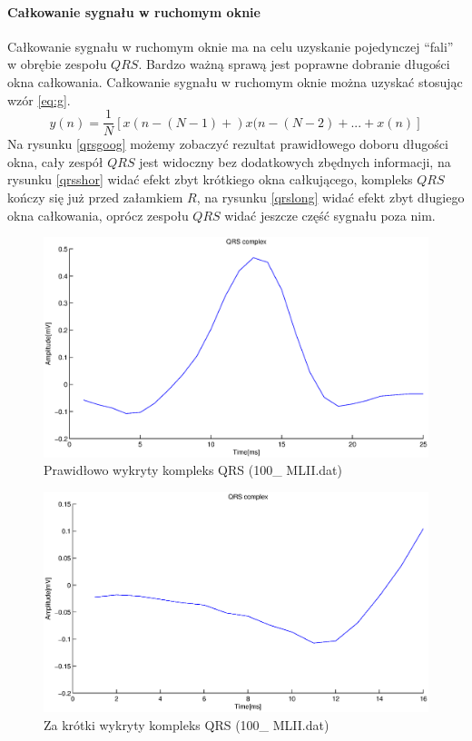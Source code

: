 \documentclass[a4paper, 11pt]{article}
\begin{document}
\paragraph{Całkowanie sygnału w ruchomym oknie}
Całkowanie sygnału w ruchomym oknie ma na celu uzyskanie pojedynczej “fali” w obrębie
zespołu $QRS$. Bardzo ważną sprawą jest poprawne dobranie długości okna całkowania. Całkowanie sygnału w ruchomym oknie można uzyskać stosując wzór \eqref{eq:g}.
\begin{equation}
y(n) = \frac{1}{N}[x(n-(N-1)+)x(n-(N-2)+...+ x(n)]\label{eq:g}
\end{equation}
Na rysunku \eqref{qrsgoog} możemy zobaczyć rezultat prawidłowego doboru długości okna, cały zespół $QRS$ jest widoczny bez dodatkowych zbędnych informacji, na rysunku \eqref{qrsshor} widać efekt zbyt krótkiego okna całkującego, kompleks $QRS$ kończy się już przed załamkiem $R$, na rysunku \eqref{qrslong} widać efekt zbyt długiego okna całkowania, oprócz zespołu $QRS$ widać jeszcze część sygnału poza nim.
\begin{figure}
\centering
\includegraphics[scale=0.3]{include/qrsgood.eps}
\caption{Prawidłowo wykryty kompleks QRS (100\_ MLII.dat)}
\label{qrsgoog}
\end{figure}
\begin{figure}
\centering
\includegraphics[scale=0.3]{include/qrsshort.eps}
\caption{Za krótki wykryty kompleks QRS (100\_ MLII.dat)}
\label{qrsshor}
\end{figure}
\end{document}
